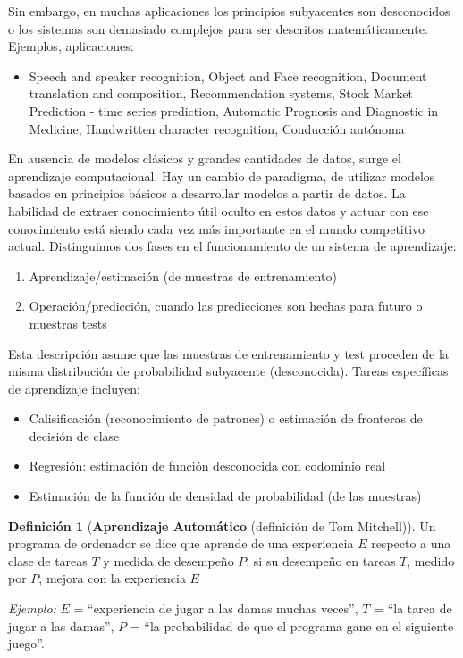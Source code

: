 \documentclass[11pt,a4paper]{article}
\theoremstyle{definition}
\newtheorem{definition}{Definición}[section]
\begin{document}
	Sin embargo, en muchas aplicaciones los principios subyacentes son desconocidos o los sistemas son demasiado complejos para ser descritos matemáticamente.\\
	Ejemplos, aplicaciones:
	\begin{itemize}
		\item Speech and speaker recognition, Object and Face recognition, Document translation and composition, Recommendation systems, Stock Market Prediction - time series prediction, Automatic Prognosis and Diagnostic in Medicine, Handwritten character recognition, Conducción autónoma
	\end{itemize}
	 En ausencia de modelos clásicos y grandes cantidades de datos, surge el aprendizaje computacional. Hay un cambio de paradigma, de utilizar modelos basados en principios básicos a desarrollar modelos a partir de datos. La habilidad de extraer conocimiento útil oculto en estos datos y actuar con ese conocimiento está siendo cada vez más importante en el mundo competitivo actual.
	 	 Distinguimos dos fases en el funcionamiento de un sistema de aprendizaje:
	 \begin{enumerate}
	 	\item Aprendizaje/estimación (de muestras de entrenamiento)
	 	\item Operación/predicción, cuando las predicciones son hechas para futuro o muestras tests
	 \end{enumerate}
	 Esta descripción asume que las muestras de entrenamiento y test proceden de la misma distribución de probabilidad subyacente (desconocida). Tareas específicas de aprendizaje incluyen:
	 \begin{itemize}
		\item Calisificación (reconocimiento de patrones) o estimación de fronteras de decisión de clase
		\item Regresión: estimación de función desconocida con codominio real
		\item Estimación de la función de densidad de probabilidad (de las muestras)
	 \end{itemize}
	 \begin{definition}[\textbf{Aprendizaje Automático} (definición de Tom Mitchell)]
	 	Un programa de ordenador se dice que aprende de una experiencia $E$ respecto a una clase de tareas $T$ y medida de desempeño $P$, si su desempeño en tareas $T$, medido por $P$, mejora con la experiencia $E$
	 \end{definition}
	 \textit{Ejemplo:} $E$ = ``experiencia de jugar a las damas muchas veces'', $T$ = ``la tarea de jugar a las damas'', $P$ = ``la probabilidad de que el programa gane en el siguiente juego''.
	 
\end{document}
